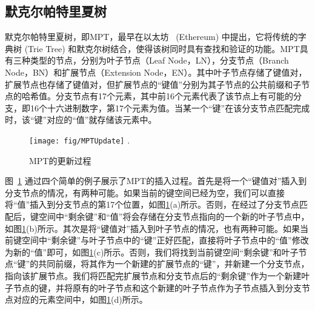 \subsection{默克尔帕特里夏树}
默克尔帕特里夏树，即MPT，最早在以太坊~ \cite{wood2014ethereum, merklepatriciatree} (Ethereum) 中提出，它将传统的字典树 (Trie Tree) 和默克尔树结合，使得该树同时具有查找和验证的功能。MPT具有三种类型的节点，分别为叶子节点（Leaf Node，LN），分支节点（Branch Node，BN）和扩展节点（Extension Node，EN）。其中叶子节点存储了键值对，扩展节点也存储了键值对，但扩展节点的“键值”分别为其子节点的公共前缀和子节点的哈希值。分支节点有17个元素，其中前16个元素代表了该节点上有可能的分支，即16个十六进制数字，第17个元素为值。当某一个“键”在该分支节点匹配完成时，该“键”对应的“值”就存储该元素中。

\begin{figure}[t]
\centering
\texttt{[image: fig/MPTUpdate]}
\DeclareGraphicsExtensions.
\caption{MPT的更新过程}
\label{fig:MPTUpdate}
\end{figure}

图~\ref{fig:MPTUpdate} 通过四个简单的例子展示了MPT的插入过程。首先是将一个“键值对”插入到分支节点的情况，有两种可能。如果当前的键空间已经为空，我们可以直接将“值”插入到分支节点的第17个位置，如图\ref{fig:MPTUpdate}(a)所示。否则，在经过了分支节点匹配后，键空间中“剩余键”和“值”将会存储在分支节点指向的一个新的叶子节点中，如图\ref{fig:MPTUpdate}(b)所示。其次是将“键值对”插入到叶子节点的情况，也有两种可能。如果当前键空间中“剩余键”与叶子节点中的“键”正好匹配，直接将叶子节点中的“值”修改为新的“值”即可，如图\ref{fig:MPTUpdate}(c)所示。否则，我们将找到当前键空间“剩余键”和叶子节点“键”的共同前缀，将其作为一个新建的扩展节点的“键”，并新建一个分支节点，指向该扩展节点。我们将匹配完扩展节点和分支节点后的“剩余键”作为一个新建叶子节点的键，并将原有的叶子节点和这个新建的叶子节点作为子节点插入到分支节点对应的元素空间中，如图\ref{fig:MPTUpdate}(d)所示。

